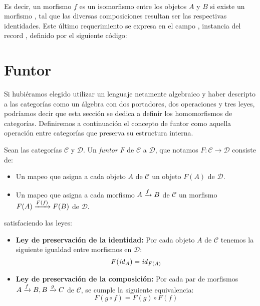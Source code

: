 \begin{agdacode}\hspace{3ex}\label{code:cat:iso}
  
\\
Es decir, un morfismo $f$ es un isomorfismo entre los objetos $A$ y $B$ si existe un morfismo , tal que las diversas composiciones resultan ser las respectivas identidades. Este último requerimiento se expresa en el campo , instancia del record , definido por el siguiente código:


\end{agdacode}


\section{Funtor}

Si hubiéramos elegido utilizar un lenguaje netamente algebraico y haber descripto a las categorías como un álgebra con dos portadores, dos operaciones y tres leyes, podríamos decir que esta sección se dedica a definir los homomorfismos de categorías. Definiremos a continuación el concepto de funtor como aquella operación entre categorías que preserva su estructura interna.

\begin{definition}
  Sean las categorías $\mathscr{C}$ y $\mathscr{D}$. Un {\it funtor} $F$ de $\mathscr{C}$ a $\mathscr{D}$, que notamos $F : \mathscr{C} \to \mathscr{D}$ consiste de:
\begin{itemize}
\item Un mapeo que asigna a cada objeto $A$ de $\mathscr{C}$ un objeto $F(A)$ de $\mathscr{D}$.
\item Un mapeo que asigna a cada morfismo $ A\xrightarrow{f}B$ de $\mathscr{C}$ un morfismo\\ $ F(A)\xrightarrow{F(f)}F(B)$ de $\mathscr{D}$.
\end{itemize}
satisfaciendo las leyes:
\begin{itemize}\renewcommand{\labelitemi}{$\star$}
    \item {\bf Ley de preservación de la identidad:} Por cada objeto $A$ de $\mathscr{C}$ tenemos la siguiente igualdad entre morfismos en $\mathscr{D}$: $$F(\mathit{id}_{A}) = \mathit{id}_{F(A)}$$
    \item {\bf Ley de preservación de la composición:} Por cada par de morfismos\\ $ A\xrightarrow{f}B,  B\xrightarrow{g}C$ de $\mathscr{C}$, se cumple la siguiente equivalencia:$$F(g \circ f) = F(g) \circ F(f)$$
  \end{itemize}
\end{definition}

